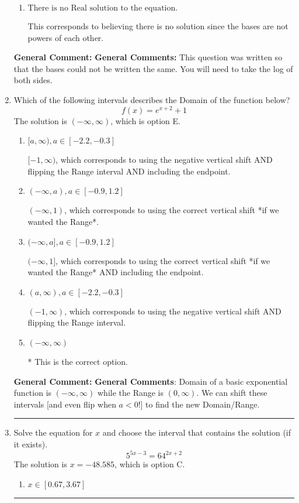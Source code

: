 \documentclass{extbook}[14pt]
\newcommand{\litem}[1]{\item #1

\rule{\textwidth}{0.4pt}}
\begin{document}
\begin{enumerate}
{\begin{enumerate}[label=\Alph*.]
$x = 0.338$, which corresponds to distributing the $\ln(base)$ to the first term of the exponent only.
\item \( \text{There is no Real solution to the equation.} \)

This corresponds to believing there is no solution since the bases are not powers of each other.
\end{enumerate}

\textbf{General Comment:} \textbf{General Comments:} This question was written so that the bases could not be written the same. You will need to take the log of both sides.
}
\litem{
Which of the following intervals describes the Domain of the function below?
\[ f(x) = e^{x+2}+1 \]The solution is \( (-\infty, \infty) \), which is option E.\begin{enumerate}[label=\Alph*.]
\item \( [a, \infty), a \in [-2.2, -0.3] \)

$[-1, \infty)$, which corresponds to using the negative vertical shift AND flipping the Range interval AND including the endpoint.
\item \( (-\infty, a), a \in [-0.9, 1.2] \)

$(-\infty, 1)$, which corresponds to using the correct vertical shift *if we wanted the Range*.
\item \( (-\infty, a], a \in [-0.9, 1.2] \)

$(-\infty, 1]$, which corresponds to using the correct vertical shift *if we wanted the Range* AND including the endpoint.
\item \( (a, \infty), a \in [-2.2, -0.3] \)

$(-1, \infty)$, which corresponds to using the negative vertical shift AND flipping the Range interval.
\item \( (-\infty, \infty) \)

* This is the correct option.
\end{enumerate}

\textbf{General Comment:} \textbf{General Comments}: Domain of a basic exponential function is $(-\infty, \infty)$ while the Range is $(0, \infty)$. We can shift these intervals [and even flip when $a<0$!] to find the new Domain/Range.
}
\litem{
Solve the equation for $x$ and choose the interval that contains the solution (if it exists).
\[ 5^{5x-3} = 64^{2x+2} \]The solution is \( x = -48.585 \), which is option C.\begin{enumerate}[label=\Alph*.]
\item \( x \in [0.67, 3.67] \)


\end{enumerate}}
\end{enumerate}
\end{document}
